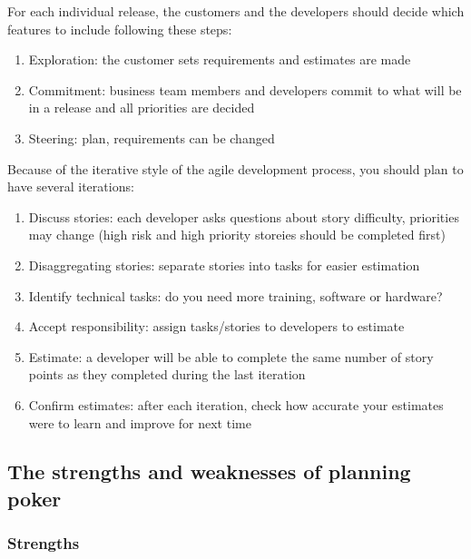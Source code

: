 For each individual release, the customers and the developers should decide which features to include following these steps:
\begin{enumerate}
	\item Exploration: the customer sets requirements and estimates are made
	\item Commitment: business team members and developers commit to what will be in a release and all priorities are decided
	\item Steering: plan, requirements can be changed
\end{enumerate}

Because of the iterative style of the agile development process, you should plan to have several iterations:
\begin{enumerate}
	\item Discuss stories: each developer asks questions about story difficulty, priorities may change (high risk and high priority storeies should be completed first)
	\item Disaggregating stories: separate stories into tasks for easier estimation
	\item Identify technical tasks: do you need more training, software or hardware?
	\item Accept responsibility: assign tasks/stories to developers to estimate
	\item Estimate: a developer will be able to complete the same number of story points as they completed during the last iteration
	\item Confirm estimates: after each iteration, check how accurate your estimates were to learn and improve for next time
\end{enumerate}

\subsection{The strengths and weaknesses of planning poker}\label{sub:the_strengths_and_weaknesses_of_planning_poker}

\subsubsection{Strengths}\label{ssub:strengths}

